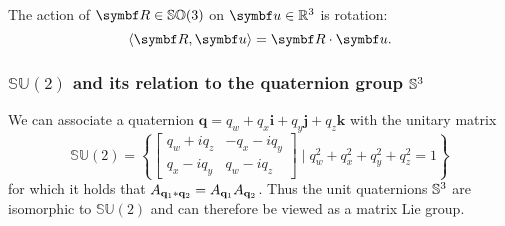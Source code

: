 The action of $\bR \in \SOthree$ on $\bu \in \mathbb{R}^3$ is rotation:
\begin{equation}
  \left \langle \bR, \bu \right \rangle = \bR \cdot \bu.
\end{equation}



\subsubsection{$\mathbb{SU}(2)$ and its relation to the quaternion group ${\mathbb{S}^3}$}

We can associate a quaternion $\symbf{q} = q_w + q_x \symbf{i} + q_y \symbf{j} + q_z \symbf{k}$ with the unitary matrix
\begin{equation}
  \label{eq:su2_matrix}
  \mathbb{SU}(2) = \left\{ \begin{bmatrix}
    q_w + i q_z & -q_x - i q_y \\
    q_x - i q_y & q_w - i q_z
  \end{bmatrix} \mid q_w^2 + q_x^2 + q_y^2 + q_z^2 = 1 \right\}
\end{equation}
for which it holds that $A_{\mathbf{q}_1 * \mathbf{q}_2} = A_{\mathbf{q}_1} A_{\mathbf{q}_2}$. Thus the unit quaternions ${\mathbb{S}^3}$ are isomorphic to $\mathbb{SU}(2)$ and can therefore be viewed as a matrix Lie group.

